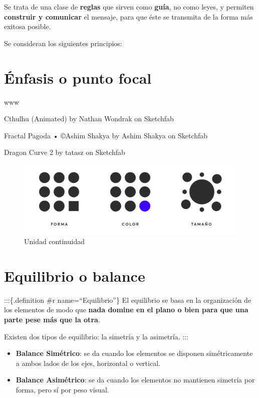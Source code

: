 \documentclass[16pt,]{krantz}
\theoremstyle{definition}
\theoremstyle{definition}
\theoremstyle{definition}
\theoremstyle{definition}
\theoremstyle{remark}
\begin{document}
Se trata de una clase de \textbf{reglas} que sirven como \textbf{guía}, no como leyes, y permiten \textbf{construir y comunicar} el mensaje, para que éste se transmita de la forma más exitosa posible.

Se consideran los siguientes principios:

\hypertarget{uxe9nfasis-o-punto-focal}{%
\section{Énfasis o punto focal}\label{uxe9nfasis-o-punto-focal}}

www

Cthulhu (Animated) by Nathan Wondrak on Sketchfab

Fractal Pagoda • ©Ashim Shakya by Ashim Shakya on Sketchfab

Dragon Curve 2 by tatasz on Sketchfab

\begin{figure}

{\centering \includegraphics[width=1\linewidth,height=1\textheight]{enfasis} 

}

\caption{Unidad continuidad}\label{fig:enfasisw}
\end{figure}

\hypertarget{equilibrio-o-balance}{%
\section{Equilibrio o balance}\label{equilibrio-o-balance}}

:::\{.definition \#r name=``Equilibrio''\} El equilibrio se basa en la organización de los elementos de modo que \textbf{nada domine en el plano o bien para que una parte pese más que la otra}.

Existen dos tipos de equilibrio: la simetría y la asimetría. :::

\begin{itemize}
\item
  \textbf{Balance Simétrico}: se da cuando los elementos se disponen simétricamente a ambos lados de los ejes, horizontal o vertical.
\item
  \textbf{Balance Asimétrico}: se da cuando los elementos no mantienen simetría por forma, pero sí por peso visual.
\end{itemize}
\end{document}
